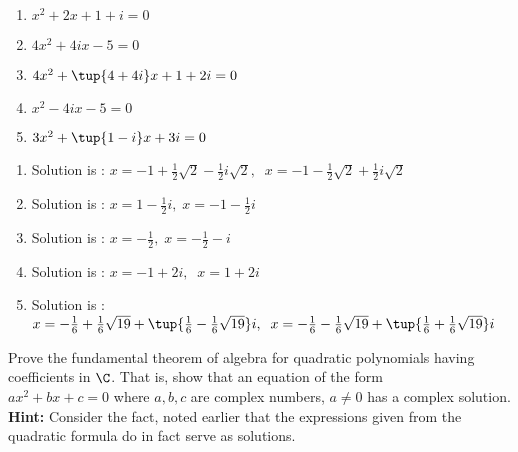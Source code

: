 \begin{enumialphparenastyle}
\begin{ex}
\begin{enumerate}
\item $x^{2}+2x+1+i=0$

\item $4x^{2}+4ix-5=0$

\item $4x^{2}+\tup{4+4i} x+1+2i=0$

\item $x^{2}-4ix-5=0$

\item $3x^{2}+\tup{1-i} x+3i=0$
\end{enumerate}
\begin{sol}
\begin{enumerate}
\item Solution is : $x=-1+\frac{1}{2}\sqrt{2}-\frac{1}{2}i
\sqrt{2},\;\;x=-1-\frac{1}{2}\sqrt{2}+\frac{1}{2}i\sqrt{2}$
\item Solution is : $x=1-\frac{1}{2}i,\;x=-1-\frac{1}{2}i$
\item Solution is : $x=-\frac{1}{2},\;x=-\frac{1}{2}-i$
\item Solution is : $x=-1+2i,\;\;x=1+2i$
\item Solution is : $x=-\frac{1}{6}+\frac{1}{6}\sqrt{19}+\tup{\frac{1}{6}-\frac{1}{6}\sqrt{19}} i,\;\;x=-\frac{1}{6}-\frac{1}{6}\sqrt{19}+\tup{\frac{1}{6}+\frac{1}{6}\sqrt{19}}i$
\end{enumerate}
\end{sol}
\end{ex}



\begin{ex} \label{exer-complex3}Prove the fundamental theorem of algebra for
quadratic polynomials having coefficients in $\C$. That is, show
that an equation of the form \\ $ax^{2}+bx+c=0$ where $a,b,c$ are complex
numbers, $a\neq 0$ has a complex solution. \textbf{Hint: }Consider the fact,
noted earlier that the expressions given from the quadratic formula do in
fact serve as solutions. 
\end{ex}

\end{enumialphparenastyle}